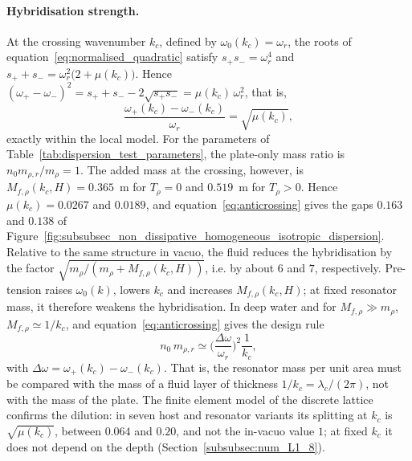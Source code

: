 {\paragraph{Hybridisation strength.} At the crossing wavenumber $k_c$, defined by $\omega_0(k_c)=\omega_r$, the roots of equation~\eqref{eq:normalised_quadratic} satisfy $s_+s_-=\omega_r^4$ and $s_++s_-=\omega_r^2\big(2+\mu(k_c)\big)$. Hence $(\omega_+-\omega_-)^2=s_++s_--2\sqrt{s_+s_-}=\mu(k_c)\,\omega_r^2$, that is,
\begin{equation}\label{eq:anticrossing}
    \frac{\omega_+(k_c)-\omega_-(k_c)}{\omega_r}=\sqrt{\mu(k_c)} ,
\end{equation}
exactly within the local model. For the parameters of Table~\ref{tab:dispersion_test_parameters}, the plate-only mass ratio is $n_0m_{\rho,r}/m_\rho=1$. The added mass at the crossing, however, is $M_{f,\rho}(k_c,H)=0.365$~m for $T_\rho=0$ and $0.519$~m for $T_\rho>0$. Hence $\mu(k_c)=0.0267$ and $0.0189$, and equation~\eqref{eq:anticrossing} gives the gaps $0.163$ and $0.138$ of Figure~\ref{fig:subsubsec_non_dissipative_homogeneous_isotropic_dispersion}. Relative to the same structure in vacuo, the fluid reduces the hybridisation by the factor $\sqrt{m_\rho/(m_\rho+M_{f,\rho}(k_c,H))}$, i.e. by about $6$ and $7$, respectively. Pre-tension raises $\omega_0(k)$, lowers $k_c$ and increases $M_{f,\rho}(k_c,H)$; at fixed resonator mass, it therefore weakens the hybridisation. In deep water and for $M_{f,\rho}\gg m_\rho$, $M_{f,\rho}\simeq1/k_c$, and equation~\eqref{eq:anticrossing} gives the design rule
\begin{equation}\label{eq:dilution_design_rule}
    n_0\,m_{\rho,r}\simeq\Big(\frac{\Delta\omega}{\omega_r}\Big)^2\frac{1}{k_c},
\end{equation}
with $\Delta\omega=\omega_+(k_c)-\omega_-(k_c)$. That is, the resonator mass per unit area must be compared with the mass of a fluid layer of thickness $1/k_c=\lambda_c/(2\pi)$, not with the mass of the plate.
{\color{red}The finite element model of the discrete lattice confirms the dilution: in seven host and resonator variants its splitting at $k_c$ is $\sqrt{\mu(k_c)}$, between $0.064$ and $0.20$, and not the in-vacuo value $1$; at fixed $k_c$ it does not depend on the depth (Section~\ref{subsubsec:num_L1_8}).}

}
